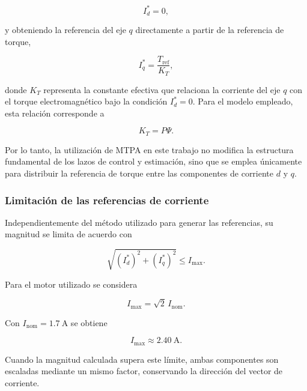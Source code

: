 \begin{equation}
I_d^{*}=0,
\end{equation}

y obteniendo la referencia del eje $q$ directamente a partir de la
referencia de torque,

\begin{equation}
I_q^{*}
=
\frac{T_{\mathrm{ref}}}{K_T},
\label{eq:Iq_ref_convencional}
\end{equation}

donde $K_T$ representa la constante efectiva que relaciona la corriente
del eje $q$ con el torque electromagnético bajo la condición
$I_d^{*}=0$. Para el modelo empleado, esta relación corresponde a

\begin{equation}
K_T=P\Psi.
\end{equation}

Por lo tanto, la utilización de MTPA en este trabajo no modifica la
estructura fundamental de los lazos de control y estimación, sino que
se emplea únicamente para distribuir la referencia de torque entre las
componentes de corriente $d$ y $q$.


\subsubsection{Limitación de las referencias de corriente}
\label{subsubsec:limitacion_referencias_corriente}

Independientemente del método utilizado para generar las referencias,
su magnitud se limita de acuerdo con

\begin{equation}
\sqrt{
\left(I_d^{*}\right)^2+
\left(I_q^{*}\right)^2
}
\leq I_{\max}.
\end{equation}

Para el motor utilizado se considera

\begin{equation}
I_{\max}
=
\sqrt{2}\,I_{\mathrm{nom}}.
\end{equation}

Con $I_{\mathrm{nom}}=1.7~\mathrm{A}$ se obtiene

\begin{equation}
I_{\max}
\approx
2.40~\mathrm{A}.
\end{equation}

Cuando la magnitud calculada supera este límite, ambas componentes son
escaladas mediante un mismo factor, conservando la dirección del vector
de corriente.

